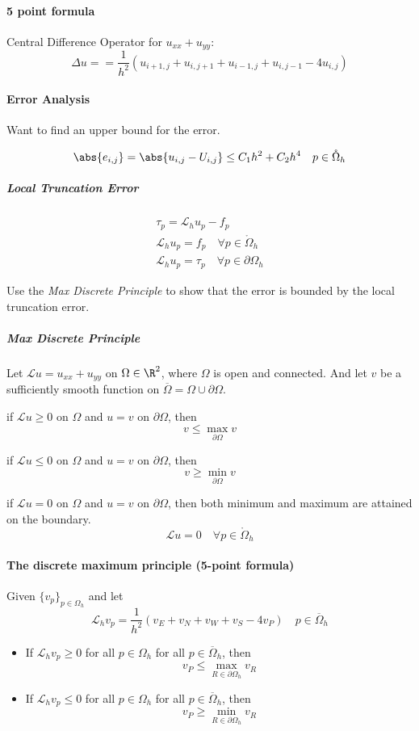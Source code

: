 \paragraph{5 point formula}
Central Difference Operator for \(u_{xx} + u_{yy}\):
\[
  \Delta u = = \frac{1}{h^2}\left(u_{i+1,j} + u_{i,j+1} + u_{i-1,j} + u_{i,j-1} - 4u_{i,j}\right)
\]

\paragraph{Error Analysis}
Want to find an upper bound for the error.

\[
  \abs{e_{i,j}} = \abs{u_{i,j} - U_{i,j}} \leq C_1h^2 + C_2h^4 \quad p\in \mathring{\Omega}_h
\]

\subparagraph{Local Truncation Error}
\begin{align*}
  \tau_p = \mathcal{L}_h u_p - f_p                                \\
  \mathcal{L}_h u_p = f_p \quad \forall p \in \mathring{\Omega}_h \\
  \mathcal{L}_h u_p = \tau_p \quad \forall p \in \partial\Omega_h
\end{align*}

Use the \emph{Max Discrete Principle} to show that the error is bounded by the local truncation error.

\subparagraph{Max Discrete Principle}
Let \(\mathcal{L}u = u_{xx} + u_{yy}\) on \(\Omega \in \R^2\), where \(\Omega\) is open and connected. And let \(v\) be a sufficiently smooth function on \(\overline{\Omega} = \Omega \cup \partial\Omega\).

if \(\mathcal{L}u \geq 0\) on \(\Omega\) and \(u = v\) on \(\partial\Omega\), then
\[
  v \leq \max_{\partial\Omega} v
\]

if \(\mathcal{L}u \leq 0\) on \(\Omega\) and \(u = v\) on \(\partial\Omega\), then
\[
  v \geq \min_{\partial\Omega} v
\]

if \(\mathcal{L}u = 0\) on \(\Omega\) and \(u = v\) on \(\partial\Omega\), then both minimum and maximum are attained on the boundary.
\[
  \mathcal{L}u = 0 \quad \forall p \in \mathring{\Omega}_h
\]

\paragraph{The discrete maximum principle (5-point formula)}

Given \(\{v_p\}_{p \in \Omega_h}\) and let
\[
  \mathcal{L}_h v_p = \frac{1}{h^2}\left(v_E + v_N + v_W + v_S - 4v_P\right) \quad p \in \overline{\Omega}_h
\]
\begin{itemize}
  \item If \(\mathcal{L}_h v_p \geq 0\) for all \(p \in \Omega_h\) for all \(p \in \overline{\Omega}_h\), then
        \[
          v_P \leq \max_{R \in \partial\Omega_h} v_R
        \]
  \item If \(\mathcal{L}_h v_p \leq 0\) for all \(p \in \Omega_h\) for all \(p \in \overline{\Omega}_h\), then
        \[
          v_P \geq \min_{R \in \partial\Omega_h} v_R
        \]
\end{itemize}

